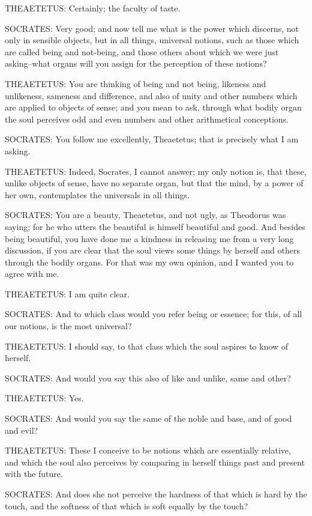 THEAETETUS: Certainly; the faculty of taste.

SOCRATES: Very good; and now tell me what is the power which discerns,
not only in sensible objects, but in all things, universal notions, such
as those which are called being and not-being, and those others
about which we were just asking--what organs will you assign for the
perception of these notions?

THEAETETUS: You are thinking of being and not being, likeness and
unlikeness, sameness and difference, and also of unity and other numbers
which are applied to objects of sense; and you mean to ask, through
what bodily organ the soul perceives odd and even numbers and other
arithmetical conceptions.

SOCRATES: You follow me excellently, Theaetetus; that is precisely what
I am asking.

THEAETETUS: Indeed, Socrates, I cannot answer; my only notion is, that
these, unlike objects of sense, have no separate organ, but that the
mind, by a power of her own, contemplates the universals in all things.

SOCRATES: You are a beauty, Theaetetus, and not ugly, as Theodorus was
saying; for he who utters the beautiful is himself beautiful and good.
And besides being beautiful, you have done me a kindness in releasing me
from a very long discussion, if you are clear that the soul views some
things by herself and others through the bodily organs. For that was my
own opinion, and I wanted you to agree with me.

THEAETETUS: I am quite clear.

SOCRATES: And to which class would you refer being or essence; for this,
of all our notions, is the most universal?

THEAETETUS: I should say, to that class which the soul aspires to know
of herself.

SOCRATES: And would you say this also of like and unlike, same and
other?

THEAETETUS: Yes.

SOCRATES: And would you say the same of the noble and base, and of good
and evil?

THEAETETUS: These I conceive to be notions which are essentially
relative, and which the soul also perceives by comparing in herself
things past and present with the future.

SOCRATES: And does she not perceive the hardness of that which is hard
by the touch, and the softness of that which is soft equally by the
touch?

